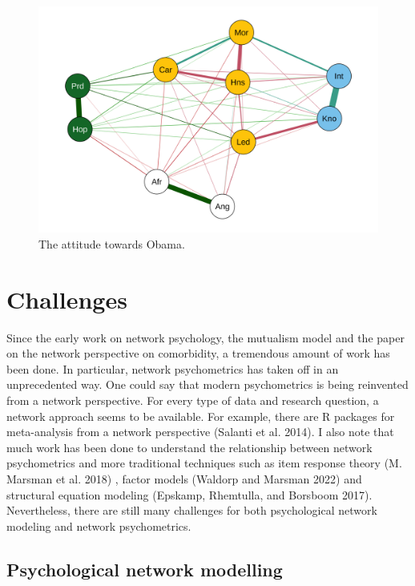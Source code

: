 \documentclass[
  a4paper,
  DIV=11,
  numbers=noendperiod,
  oneside]{scrreprt}
\begin{document}
\begin{figure}

{\centering \includegraphics{media/ch6/fig-ch6-img19-old-88.png}

}

\caption{\label{fig-ch6-img19-old-88}The attitude towards Obama.}

\end{figure}

\hypertarget{sec-Challenges}{%
\section{Challenges}\label{sec-Challenges}}

Since the early work on network psychology, the mutualism model and the
paper on the network perspective on comorbidity, a tremendous amount of
work has been done. In particular, network psychometrics has taken off
in an unprecedented way. One could say that modern psychometrics is
being reinvented from a network perspective. For every type of data and
research question, a network approach seems to be available. For
example, there are R packages for meta-analysis from a network
perspective (Salanti et al. 2014). I also note that much work has been
done to understand the relationship between network psychometrics and
more traditional techniques such as item response theory (M. Marsman et
al. 2018) , factor models (Waldorp and Marsman 2022) and structural
equation modeling (Epskamp, Rhemtulla, and Borsboom 2017). Nevertheless,
there are still many challenges for both psychological network modeling
and network psychometrics.

\hypertarget{sec-Psychological-network-modelling}{%
\subsection{Psychological network
modelling}\label{sec-Psychological-network-modelling}}
\end{document}
